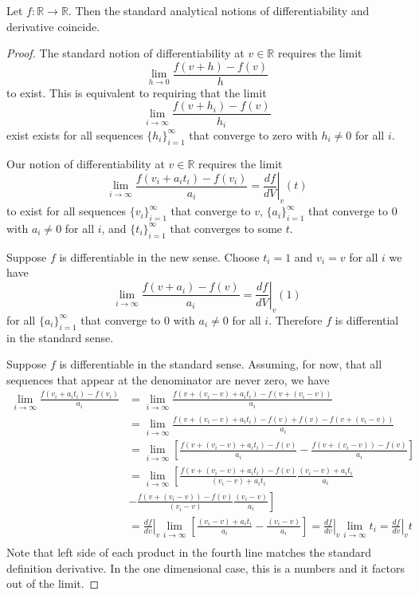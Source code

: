 \documentclass[11pt,letterpaper,fleqn]{memoir}
\begin{document}
\begin{prop}
	Let $f:\mathbb{R} \to \mathbb{R}$. Then the standard analytical notions of differentiability and derivative coincide.
\end{prop}
\begin{proof}
	The standard notion of differentiability at $v \in \mathbb{R}$ requires the limit
	$$ \lim\limits_{h \to 0} \frac{f(v + h) - f(v)}{h} $$
	to exist. This is equivalent to requiring that the limit
	$$ \lim\limits_{i \to \infty} \frac{f(v + h_i) - f(v)}{h_i} $$
	exist exists for all sequences $\{h_i\}_{i=1}^{\infty}$ that converge to zero with $h_i \neq 0$ for all $i$.
	
	Our notion of differentiability at $v \in \mathbb{R}$ requires the limit
	$$ \lim\limits_{i \to \infty} \frac{f(v_i + a_i t_i) - f(v_i)}{a_i} = \left.\frac{df}{dV} \right|_{v} (t)$$
	to exist for all sequences $\{v_i\}_{i=1}^{\infty}$ that converge to $v$, $\{a_i\}_{i=1}^{\infty}$ that converge to $0$ with $a_i \neq 0$ for all $i$, and $\{t_i\}_{i=1}^{\infty}$ that converges to some $t$.
	
	Suppose $f$ is differentiable in the new sense. Choose $t_i = 1$ and $v_i = v$ for all $i$ we have
	$$ \lim\limits_{i \to \infty} \frac{f(v + a_i) - f(v)}{a_i} = \left.\frac{df}{dV} \right|_{v} (1)$$
	for all $\{a_i\}_{i=1}^{\infty}$ that converge to $0$ with $a_i \neq 0$ for all $i$. Therefore $f$ is differential in the standard sense.
	
	Suppose $f$ is differentiable in the standard sense. Assuming, for now, that all sequences that appear at the denominator are never zero, we have
	\begin{align*}
		\lim\limits_{i \to \infty} \frac{f(v_i + a_i t_i) - f(v_i)}{a_i} &= \lim\limits_{i \to \infty} \frac{f(v + (v_i - v) + a_i t_i) - f(v + (v_i - v))}{a_i} \\
		&= \lim\limits_{i \to \infty} \frac{f(v + (v_i - v) + a_i t_i) - f(v) + f(v) - f(v + (v_i - v))}{a_i} \\
		&= \lim\limits_{i \to \infty} \left[\frac{f(v + (v_i - v) + a_i t_i) - f(v)}{a_i}
		- \frac{f(v + (v_i - v)) - f(v)}{a_i} \right]\\
		&= \lim\limits_{i \to \infty} \left[ \frac{f(v + (v_i - v) + a_i t_i) - f(v)}{(v_i - v) + a_i t_i} \frac{(v_i - v) + a_i t_i}{a_i} \right. \\
		&- \left.\frac{f(v + (v_i - v)) - f(v)}{(v_i - v)}  \frac{(v_i - v)}{a_i} \right] \\
		&=  \left.\frac{df}{dv} \right|_{v} \lim\limits_{i \to \infty} \left[ \frac{(v_i - v) + a_i t_i}{a_i} -  \frac{(v_i - v)}{a_i}\right] = \left.\frac{df}{dv} \right|_{v} \lim\limits_{i \to \infty} t_i = \left.\frac{df}{dv} \right|_{v} t \\
	\end{align*}
	Note that left side of each product in the fourth line matches the standard definition derivative. In the one dimensional case, this is a numbers and it factors out of the limit.
\end{proof}
\end{document}

